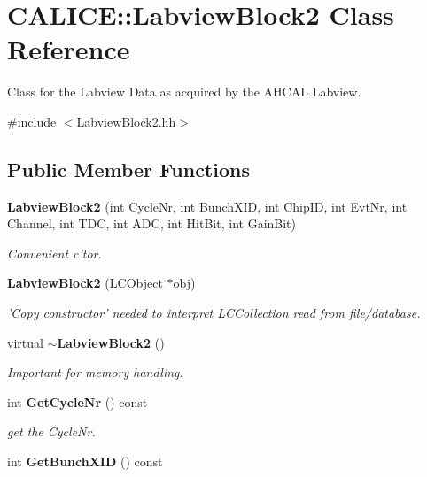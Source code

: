 \section{CALICE::LabviewBlock2 Class Reference}
\label{classCALICE_1_1LabviewBlock2}


Class for the Labview Data as acquired by the AHCAL Labview.  


{\ttfamily \#include $<$LabviewBlock2.hh$>$}\subsection*{Public Member Functions}
\begin{DoxyCompactItemize}
\item 
{\bf LabviewBlock2} (int CycleNr, int BunchXID, int ChipID, int EvtNr, int Channel, int TDC, int ADC, int HitBit, int GainBit)\label{classCALICE_1_1LabviewBlock2_aa409f51a0803d4ca5e6fe15204262118}

\begin{DoxyCompactList}\small\item\em Convenient c'tor. \item\end{DoxyCompactList}\item 
{\bf LabviewBlock2} (LCObject $\ast$obj)\label{classCALICE_1_1LabviewBlock2_acb5c7d7d0a0d9aecff3434f8b712745d}

\begin{DoxyCompactList}\small\item\em 'Copy constructor' needed to interpret LCCollection read from file/database. \item\end{DoxyCompactList}\item 
virtual {\bf $\sim$LabviewBlock2} ()\label{classCALICE_1_1LabviewBlock2_aabc7bc093f568a532a4cf7097a84fb99}

\begin{DoxyCompactList}\small\item\em Important for memory handling. \item\end{DoxyCompactList}\item 
int {\bf GetCycleNr} () const \label{classCALICE_1_1LabviewBlock2_aabd11e4b300c4a3644ff5fbbf513af36}

\begin{DoxyCompactList}\small\item\em get the CycleNr. \item\end{DoxyCompactList}\item 
int {\bf GetBunchXID} () const \label{classCALICE_1_1LabviewBlock2_ae25025f2f9bc95883c2d6b23d38ecc8e}


\end{DoxyCompactItemize}

